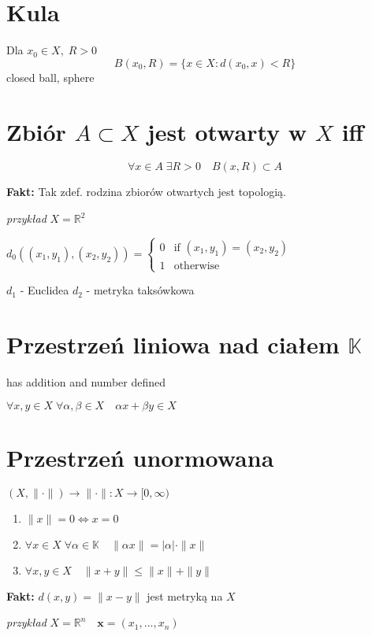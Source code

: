 \documentclass{article}
\begin{document}
\section{Kula}
Dla $x_0 \in X, \; R > 0$
$$B(x_0, R) = \{x \in X: d(x_0, x) < R\}$$
closed ball, sphere

\section{Zbiór $A \subset X$ jest otwarty w $X$ iff}
$$\forall x \in A \; \exists R > 0 \quad B(x, R) \subset A$$

\textbf{Fakt:} Tak zdef. rodzina zbiorów otwartych jest topologią.

\vspace{0.3cm}
\textit{przykład} $X = \mathbb{R}^2$

$d_0((x_1,y_1), (x_2,y_2)) = \begin{cases} 
0 & \text{if } (x_1,y_1) = (x_2,y_2) \\
1 & \text{otherwise}
\end{cases}$

$d_1$ - Euclidea
$d_2$ - metryka taksówkowa

\section{Przestrzeń liniowa nad ciałem $\mathbb{K}$}
has addition and number defined

$\forall x,y \in X \; \forall \alpha,\beta \in X \quad \alpha x + \beta y \in X$

\section{Przestrzeń unormowana}
$(X, \|\cdot\|) \rightarrow \|\cdot\|: X \to [0,\infty)$

\begin{enumerate}
\item $\|x\| = 0 \Leftrightarrow x = 0$
\item $\forall x \in X \; \forall \alpha \in \mathbb{K} \quad \|\alpha x\| = |\alpha| \cdot \|x\|$
\item $\forall x,y \in X \quad \|x+y\| \leq \|x\| + \|y\|$
\end{enumerate}

\textbf{Fakt:} $d(x,y) = \|x-y\|$ jest metryką na $X$

\vspace{0.3cm}
\textit{przykład} $X = \mathbb{R}^n \quad \mathbf{x} = (x_1, \ldots, x_n)$
\end{document}
